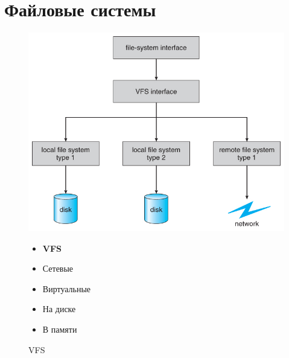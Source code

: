 \documentclass[../../lectures.tex]{subfiles}
\begin{document}
\section{Файловые системы}
\begin{figure}[H]
\begin{minipage}[c]{0.6\linewidth}
\centering
\includegraphics[width=\textwidth]{images/virtual-fs.jpg}
\caption{VFS}
\end{minipage}
\begin{minipage}[c]{0.4\linewidth}
\begin{itemize}
    \item \textbf{VFS}
    \item Сетевые
    \item Виртуальные
    \item На диске
    \item В памяти
\end{itemize}
\end{minipage}
\end{figure}
\end{document}
